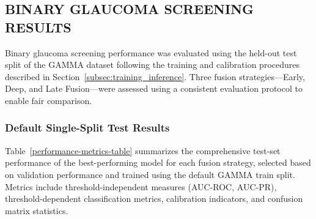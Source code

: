 \documentclass[preprint,12pt]{elsarticle}
\begin{document}
\subsection{BINARY GLAUCOMA SCREENING RESULTS}
\label{subsec:binary_results}

Binary glaucoma screening performance was evaluated using the held-out test split of the GAMMA dataset following the training and calibration procedures described in Section~\ref{subsec:training_inference}. Three fusion strategies—Early, Deep, and Late Fusion—were assessed using a consistent evaluation protocol to enable fair comparison.

\subsubsection{Default Single-Split Test Results}
Table~\ref{performance-metrics-table} summarizes the comprehensive test-set performance of the best-performing model for each fusion strategy, selected based on validation performance and trained using the default GAMMA train split. Metrics include threshold-independent measures (AUC-ROC, AUC-PR), threshold-dependent classification metrics, calibration indicators, and confusion matrix statistics.

\begin{table}[htb]
    \centering
    \caption{Comprehensive test set performance metrics for binary glaucoma screening (best model per fusion strategy).}
    \label{performance-metrics-table}
    \scriptsize
    \setlength{\tabcolsep}{6pt}
\end{table}
\end{document}
